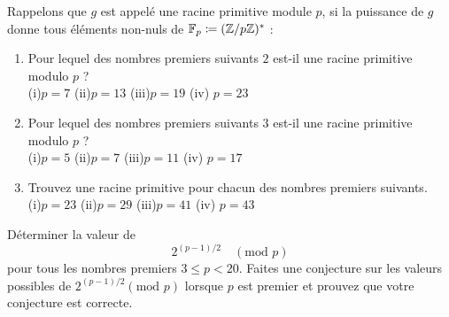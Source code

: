 \begin{exercise}
    Rappelons que $g$ est appelé une racine primitive module $p$, si la puissance de $g$ donne tous éléments non-nuls de $\mathbb{F}_p \coloneqq (\mathbb{Z}/p\mathbb{Z})^*$ :
    \begin{enumerate}[label=(\alph*)]
        \item Pour lequel des nombres premiers suivants $2$ est-il une racine primitive modulo $p$ ?\\
        (i)\quad$p = 7$ \qquad (ii)\quad$p=13$ \qquad (iii)\quad$p=19$ \qquad (iv) $p=23$
        \item Pour lequel des nombres premiers suivants $3$ est-il une racine primitive modulo $p$ ?\\
        (i)\quad$p = 5$ \qquad (ii)\quad$p=7$ \qquad (iii)\quad$p=11$ \qquad (iv) $p=17$
        \item Trouvez une racine primitive pour chacun des nombres premiers suivants.\\
        (i)\quad$p = 23$ \qquad (ii)\quad$p=29$ \qquad (iii)\quad$p=41$ \qquad (iv) $p=43$
    \end{enumerate}
\end{exercise}

\begin{exercise}
    Déterminer la valeur de 
    $$2^{(p-1)/2}\quad(\text{mod } p)$$
    pour tous les nombres premiers $3 \leq p < 20$. Faites une conjecture sur les valeurs possibles de $2^{(p-1)/2} (\text{mod } p)$ lorsque $p$ est premier et prouvez que votre conjecture est correcte.
\end{exercise}
